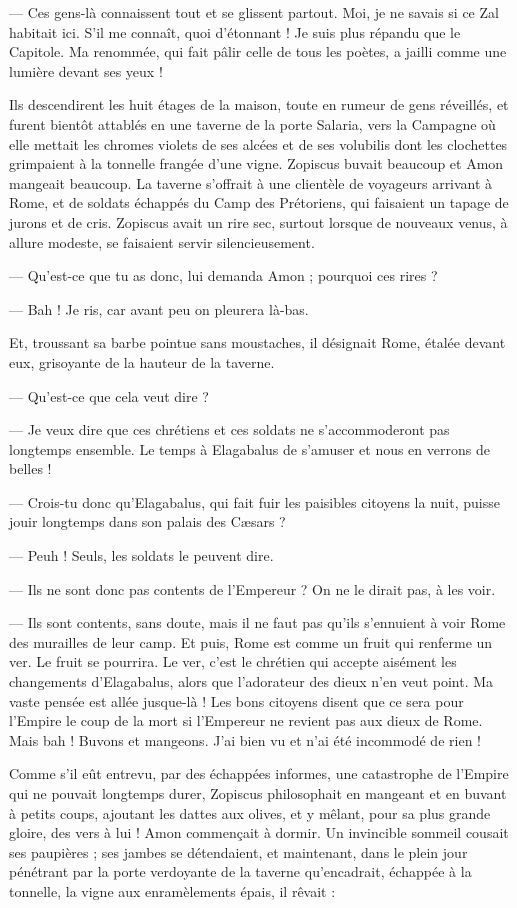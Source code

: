 \documentclass[a4paper, 11pt, oneside, polutonikogreek, french]{article}
\begin{document}
--- Ces gens-là connaissent tout et se glissent partout. Moi, je ne savais si ce Zal habitait ici. S'il me connaît, quoi d'étonnant ! Je suis plus répandu que le Capitole. Ma renommée, qui fait pâlir celle de tous les poètes, a jailli comme une lumière devant ses yeux !

Ils descendirent les huit étages de la maison, toute en rumeur de gens réveillés, et furent bientôt attablés en une taverne de la porte Salaria, vers la Campagne où elle mettait les chromes violets de ses alcées et de ses volubilis dont les clochettes grimpaient à la tonnelle frangée d'une vigne. Zopiscus buvait beaucoup et Amon mangeait beaucoup. La taverne s'offrait à une clientèle de voyageurs arrivant à Rome, et de soldats échappés du Camp des Prétoriens, qui faisaient un tapage de jurons et de cris. Zopiscus avait un rire sec, surtout lorsque de nouveaux venus, à allure modeste, se faisaient servir silencieusement.

--- Qu'est-ce que tu as donc, lui demanda Amon ; pourquoi ces rires ?

--- Bah ! Je ris, car avant peu on pleurera là-bas.

Et, troussant sa barbe pointue sans moustaches, il désignait Rome, étalée devant eux, grisoyante de la hauteur de la taverne.

--- Qu'est-ce que cela veut dire ?

--- Je veux dire que ces chrétiens et ces soldats ne s'accommoderont pas longtemps ensemble. Le temps à Elagabalus de s'amuser et nous en verrons de belles !

--- Crois-tu donc qu'Elagabalus, qui fait fuir les paisibles citoyens la nuit, puisse jouir longtemps dans son palais des Cæsars ?

--- Peuh ! Seuls, les soldats le peuvent dire.

--- Ils ne sont donc pas contents de l'Empereur ? On ne le dirait pas, à les voir.

--- Ils sont contents, sans doute, mais il ne faut pas qu'ils s'ennuient à voir Rome des murailles de leur camp. Et puis, Rome est comme un fruit qui renferme un ver. Le fruit se pourrira. Le ver, c'est le chrétien qui accepte aisément les changements d'Elagabalus, alors que l'adorateur des dieux n'en veut point. Ma vaste pensée est allée jusque-là ! Les bons citoyens disent que ce sera pour l'Empire le coup de la mort si l'Empereur ne revient pas aux dieux de Rome. Mais bah ! Buvons et mangeons. J'ai bien vu et n'ai été incommodé de rien !

Comme s'il eût entrevu, par des échappées informes, une catastrophe de l'Empire qui ne pouvait longtemps durer, Zopiscus philosophait en mangeant et en buvant à petits coups, ajoutant les dattes aux olives, et y mêlant, pour sa plus grande gloire, des vers à lui ! Amon commençait à dormir. Un invincible sommeil cousait ses paupières ; ses jambes se détendaient, et maintenant, dans le plein jour pénétrant par la porte verdoyante de la taverne qu'encadrait, échappée à la tonnelle, la vigne aux enramèlements épais, il rêvait :
\end{document}
